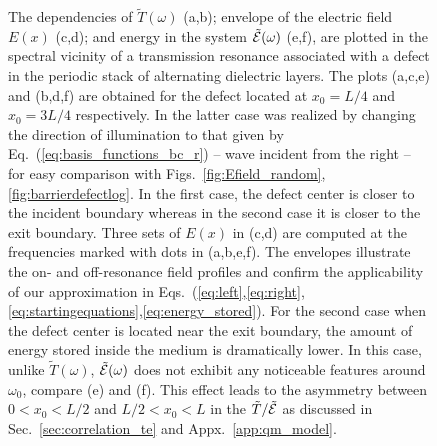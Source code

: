 \begin{figure}
\vskip -0.0in
\centerline{}
\vskip 0.0in
\caption[The dependencies of $\tilde{T}(\omega )$ (a,b); envelope of the electric field  $E(x)$ (c,d); and energy in the system $\tilde{\cal E}(\omega )$ (e,f), are plotted in the spectral vicinity of a transmission resonance associated with a defect in the periodic stack of alternating dielectric layers.]{The dependencies of $\tilde{T}(\omega )$ (a,b); envelope of the electric field  $E(x)$ (c,d); and energy in the system $\tilde{\cal E}(\omega )$ (e,f), are plotted in the spectral vicinity of a transmission resonance associated with a defect in the periodic stack of alternating dielectric layers. The plots (a,c,e) and (b,d,f) are obtained for the defect located at $x_0=L/4$ and $x_0=3L/4$ respectively. In the latter case was realized by changing the direction of illumination to that given by Eq.~(\ref{eq:basis_functions_bc_r}) -- wave incident from the right -- for easy comparison with Figs.~\ref{fig:Efield_random},\ref{fig:barrierdefectlog}. In the first case, the defect center is closer to the incident boundary whereas in the second case it is closer to the exit boundary. Three sets of $E(x)$ in (c,d) are computed at the frequencies marked with dots in (a,b,e,f). The envelopes illustrate the on- and off-resonance field profiles and confirm the applicability of our approximation in Eqs.~(\ref{eq:left},\ref{eq:right},\ref{eq:startingequations},\ref{eq:energy_stored}). For the second case when the defect center is located near the exit boundary, the amount of energy stored inside the medium is dramatically lower. In this case, unlike $\tilde{T}(\omega )$, $\tilde{\cal E}(\omega )$ does not exhibit any noticeable features around $\omega_0$, compare (e) and (f). This effect leads to the asymmetry between $0<x_0<L/2$ and $L/2<x_0<L$ in the $\tilde{T}/\tilde{\cal E}$ as discussed in Sec.~\ref{sec:correlation_te} and Appx.~\ref{app:qm_model}.
\label{fig:peaksmatchnotmatch}}
\end{figure}

